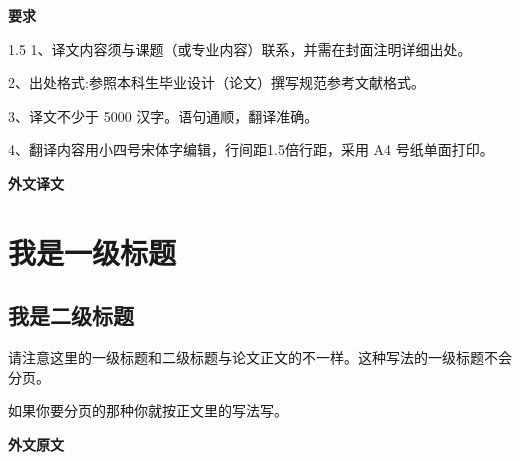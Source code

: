 \documentclass{csustThesis}
\begin{document}
    \makeTranslationCover

    \pagestyle{empty}  %

    \begin{titlepage}

    \begin{center}
        \bfseries 要求
    \end{center}

    \begin{spacing}{1.5}
1、译文内容须与课题（或专业内容）联系，并需在封面注明详细出处。

2、出处格式:参照本科生毕业设计（论文）撰写规范参考文献格式。

3、译文不少于 5000 汉字。语句通顺，翻译准确。

4、翻译内容用小四号宋体字编辑，行间距1.5倍行距，采用 A4 号纸单面打印。
    \end{spacing}

    \vspace*{\fill}
    \end{titlepage}
    \begin{titlepage}
    \vspace*{\fill}

    \begin{center}
        \bfseries 外文译文
    \end{center}

    \vspace*{\fill}
    \end{titlepage}


    \section{我是一级标题}

    \subsection{我是二级标题}

    请注意这里的一级标题和二级标题与论文正文的不一样。这种写法的一级标题不会分页。

    如果你要分页的那种你就按正文里的写法写。


    \begin{titlepage}
    \vspace*{\fill}

    \begin{center}
        \bfseries 外文原文
    \end{center}

    \vspace*{\fill}
    \end{titlepage}

\end{document}
